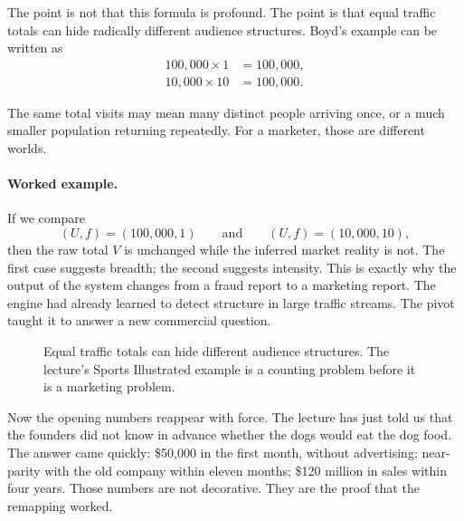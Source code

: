 The point is not that this formula is profound. The point is that equal traffic totals can hide radically different audience structures. Boyd's example can be written as
\begin{align}
100{,}000\times 1 &= 100{,}000,\\
10{,}000\times 10 &= 100{,}000.
\end{align}

The same total visits may mean many distinct people arriving once, or a much smaller population returning repeatedly. For a marketer, those are different worlds.

\paragraph{Worked example.} If we compare
\[
(U,f)=(100{,}000,1)
\qquad\text{and}\qquad
(U,f)=(10{,}000,10),
\]
then the raw total \(V\) is unchanged while the inferred market reality is not. The first case suggests breadth; the second suggests intensity. This is exactly why the output of the system changes from a fraud report to a marketing report. The engine had already learned to detect structure in large traffic streams. The pivot taught it to answer a new commercial question.

\begin{figure}[h]
\centering
{}
\caption{Equal traffic totals can hide different audience structures. The lecture's Sports Illustrated example is a counting problem before it is a marketing problem.}
\end{figure}

Now the opening numbers reappear with force. The lecture has just told us that the founders did not know in advance whether the dogs would eat the dog food. The answer came quickly: \$50,000 in the first month, without advertising; near-parity with the old company within eleven months; \$120 million in sales within four years. Those numbers are not decorative. They are the proof that the remapping worked.

